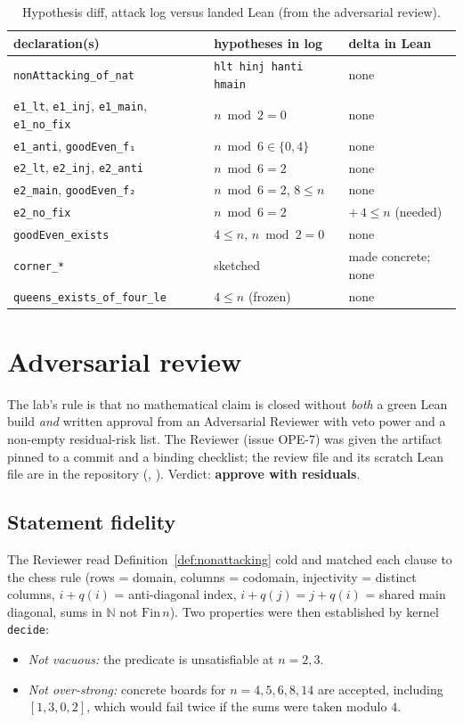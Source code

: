 \documentclass[11pt,a4paper]{article}
\theoremstyle{definition}
\theoremstyle{remark}
\newcommand{\lean}[1]{\texttt{#1}}
\newcommand{\N}{\mathbb{N}}
\newcommand{\Fin}{\mathrm{Fin}\,}
\begin{document}
\begin{table}[ht]
\centering\small
\begin{tabular}{@{}lll@{}}
\toprule
declaration(s) & hypotheses in log & delta in Lean \\
\midrule
\lean{nonAttacking\_of\_nat} & \lean{hlt hinj hanti hmain} & none \\
\lean{e1\_lt}, \lean{e1\_inj}, \lean{e1\_main}, \lean{e1\_no\_fix} & $n\bmod 2=0$ & none \\
\lean{e1\_anti}, \lean{goodEven\_f₁} & $n\bmod 6\in\{0,4\}$ & none \\
\lean{e2\_lt}, \lean{e2\_inj}, \lean{e2\_anti} & $n\bmod 6=2$ & none \\
\lean{e2\_main}, \lean{goodEven\_f₂} & $n\bmod 6=2$, $8\le n$ & none \\
\lean{e2\_no\_fix} & $n\bmod 6=2$ & \textbf{$+\,4\le n$} (needed) \\
\lean{goodEven\_exists} & $4\le n$, $n\bmod 2=0$ & none \\
\lean{corner\_*} & sketched & made concrete; none \\
\lean{queens\_exists\_of\_four\_le} & $4\le n$ (frozen) & none \\
\bottomrule
\end{tabular}
\caption{Hypothesis diff, attack log versus landed Lean (from the adversarial review).}
\label{tab:hypdiff}
\end{table}

\section{Adversarial review}
\label{sec:review}

The lab's rule is that no mathematical claim is closed without \emph{both} a green Lean
build \emph{and} written approval from an Adversarial Reviewer with veto power and a
non-empty residual-risk list. The Reviewer (issue OPE-7) was given the artifact pinned to a
commit and a binding checklist; the review file and its scratch Lean file are in the
repository (,
). Verdict: \textbf{approve with residuals}.

\subsection{Statement fidelity}

The Reviewer read Definition~\ref{def:nonattacking} cold and matched each clause to the
chess rule (rows = domain, columns = codomain, injectivity = distinct columns, $i+q(i)$ =
anti-diagonal index, $i+q(j)=j+q(i)$ = shared main diagonal, sums in $\N$ not
$\Fin n$). Two properties were then established by kernel \lean{decide}:
\begin{itemize}[nosep]
\item \emph{Not vacuous:} the predicate is unsatisfiable at $n=2,3$.
\item \emph{Not over-strong:} concrete boards for $n=4,5,6,8,14$ are accepted, including
$[1,3,0,2]$, which would fail twice if the sums were taken modulo $4$.
\end{itemize}
\end{document}
